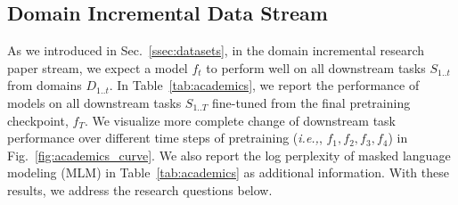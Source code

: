 \subsection{Domain Incremental Data Stream}
As we introduced in Sec.~\ref{ssec:datasets}, in the domain incremental research paper stream, %
we expect a model $f_t$ to perform well on all downstream tasks $S_{1..t}$ from domains $D_{1..t}$.
In Table~\ref{tab:academics}, we report the performance of models on all downstream tasks $S_{1..T}$ fine-tuned from the final pretraining checkpoint, $f_T$. 
We visualize more complete change of downstream task performance over different time steps of pretraining (\textit{i.e.,}, $f_1, f_2,f_3,f_4$) in Fig.~\ref{fig:academics_curve}. We also report the log perplexity of masked language modeling (MLM) in Table~\ref{tab:academics} as additional information. With these results, we address the research questions below.





